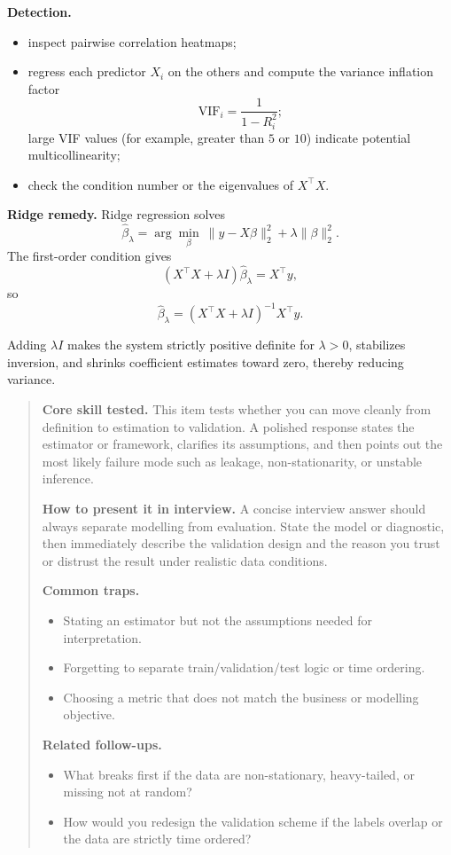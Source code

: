 \documentclass[11pt,letterpaper,openany]{book}
\newenvironment{EditorialNote}
  {\begin{quote}\small\setlength{\parskip}{0.25em}}
  {\end{quote}}
\newcommand{\QuestionSpacer}{\vspace{0.4em}}
\begin{document}
\textbf{Detection.}
\begin{itemize}
\item inspect pairwise correlation heatmaps;
\item regress each predictor \(X_i\) on the others and compute the variance inflation factor
\[
\mathrm{VIF}_i=\frac{1}{1-R_i^2};
\]
large VIF values (for example, greater than \(5\) or \(10\)) indicate potential multicollinearity;
\item check the condition number or the eigenvalues of \(X^\top X\).
\end{itemize}

\textbf{Ridge remedy.} Ridge regression solves
\[
\hat{\beta}_\lambda
=
\arg\min_{\beta}\ \|y-X\beta\|_2^2+\lambda \|\beta\|_2^2.
\]
The first-order condition gives
\[
(X^\top X+\lambda I)\hat{\beta}_\lambda=X^\top y,
\]
so
\[
\hat{\beta}_\lambda=(X^\top X+\lambda I)^{-1}X^\top y.
\]

Adding \(\lambda I\) makes the system strictly positive definite for \(\lambda>0\), stabilizes inversion, and shrinks coefficient estimates toward zero, thereby reducing variance.

\begin{EditorialNote}


\textbf{Core skill tested.} This item tests whether you can move cleanly from definition to estimation to validation. A polished response states the estimator or framework, clarifies its assumptions, and then points out the most likely failure mode such as leakage, non-stationarity, or unstable inference.

\textbf{How to present it in interview.} A concise interview answer should always separate modelling from evaluation. State the model or diagnostic, then immediately describe the validation design and the reason you trust or distrust the result under realistic data conditions.

\textbf{Common traps.}
\begin{itemize}
\item Stating an estimator but not the assumptions needed for interpretation.
\item Forgetting to separate train/validation/test logic or time ordering.
\item Choosing a metric that does not match the business or modelling objective.
\end{itemize}

\textbf{Related follow-ups.}
\begin{itemize}
\item What breaks first if the data are non-stationary, heavy-tailed, or missing not at random?
\item How would you redesign the validation scheme if the labels overlap or the data are strictly time ordered?
\end{itemize}


\end{EditorialNote}
\QuestionSpacer
\end{document}
